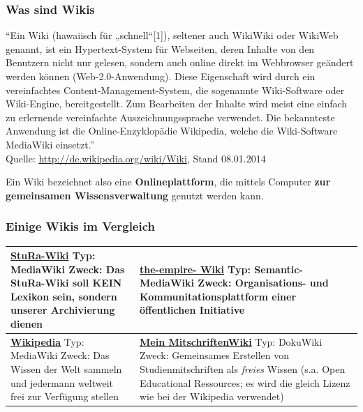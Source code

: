 \documentclass{beamer}
\begin{document}
\begin{frame}
  \frametitle{Was sind Wikis}
  \begin{block}{}
    {\tiny “Ein Wiki (hawaiisch für „schnell“[1]), seltener auch WikiWiki
    oder WikiWeb genannt, ist ein Hypertext-System für Webseiten, deren
    Inhalte von den Benutzern nicht nur gelesen, sondern auch online direkt
    im Webbrowser geändert werden können (Web-2.0-Anwendung). Diese
    Eigenschaft wird durch ein vereinfachtes Content-Management-System, die
    sogenannte Wiki-Software oder Wiki-Engine, bereitgestellt. Zum
    Bearbeiten der Inhalte wird meist eine einfach zu erlernende
    vereinfachte Auszeichnungssprache verwendet. Die bekannteste Anwendung
    ist die Online-Enzyklopädie Wikipedia, welche die Wiki-Software
    MediaWiki einsetzt.” \\ Quelle: \url{http://de.wikipedia.org/wiki/Wiki}, Stand 08.01.2014}
  \end{block}
  \begin{block}{}
    Ein Wiki bezeichnet also eine \textbf{Onlineplattform}, die mittels
    Computer \textbf{zur gemeinsamen Wissensverwaltung} genutzt werden
    kann.
  \end{block}
\end{frame}

\begin{frame}
  \frametitle{Einige Wikis im Vergleich}
  \begin{table}
    \caption{Wikivergleich1}
    \label{tab:Wikivergleich1}

    \begin{center}
      \begin{longtable}{|l|l|}
        \hline
        \textbf{\href{http://wiki.stura.htw-dresden.de}{StuRa-Wiki}}
        Typ: MediaWiki
        Zweck: Das StuRa-Wiki soll KEIN Lexikon sein, sondern unserer Archivierung dienen &
        \textbf{\href{http://www.the-empire.de}{the-empire- Wiki}}
        Typ: Semantic-MediaWiki
        Zweck: Organisations- und Kommunitationsplattform einer öffentlichen Initiative \\ 
        \hline

        \textbf{\href{http://www.wikipedia.de}{Wikipedia}}
        Typ: MediaWiki
        Zweck: Das Wissen der Welt sammeln und jedermann weltweit frei zur Verfügung stellen &
        \textbf{\href{http://www2.htw-dresden.de/~s70341/cgi-bin/dokuwiki/doku.php}{Mein MitschriftenWiki}}
        Typ: DokuWiki
        Zweck: Gemeinsames Erstellen von Studienmitschriften als \emph{freies} Wissen (s.a.  Open Educational Ressources; es wird die gleich Lizenz wie bei der Wikipedia verwendet) \\ 
        \hline
      \end{longtable}
    \end{center}
  \end{table}

\end{frame}
\end{document}
